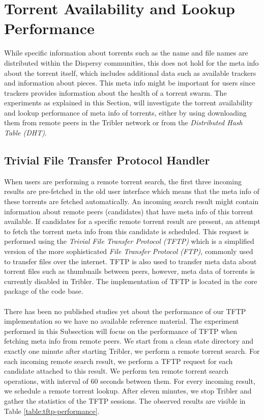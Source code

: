\section{Torrent Availability and Lookup Performance}
While specific information about torrents such as the name and file names are distributed within the Dispersy communities, this does not hold for the meta info about the torrent itself, which includes additional data such as available trackers and information about pieces. This meta info might be important for users since trackers provides information about the health of a torrent swarm. The experiments as explained in this Section, will investigate the torrent availability and lookup performance of meta info of torrents, either by using downloading them from remote peers in the Tribler network or from the \emph{Distributed Hash Table (DHT)}.

\subsection{Trivial File Transfer Protocol Handler}
When users are performing a remote torrent search, the first three incoming results are pre-fetched in the old user interface which means that the meta info of these torrents are fetched automatically. An incoming search result might contain information about remote peers (candidates) that have meta info of this torrent available. If candidates for a specific remote torrent result are present, an attempt to fetch the torrent meta info from this candidate is scheduled. This request is performed using the \emph{Trivial File Transfer Protocol (TFTP)}\cite{sollins1992tftp} which is a simplified version of the more sophisticated \emph{File Transfer Protocol (FTP)}\cite{postel1985rfc}, commonly used to transfer files over the internet. TFTP is also used to transfer meta data about torrent files such as thumbnails between peers, however, meta data of torrents is currently disabled in Tribler. The implementation of TFTP is located in the core package of the code base.\\\\
There has been no published studies yet about the performance of our TFTP implementation so we have no available reference material. The experiment performed in this Subsection will focus on the performance of TFTP when fetching meta info from remote peers. We start from a clean state directory and exactly one minute after starting Tribler, we perform a remote torrent search. For each incoming remote search result, we perform a TFTP request for each candidate attached to this result. We perform ten remote torrent search operations, with interval of 60 seconds between them. For every incoming result, we schedule a remote torrent lookup. After eleven minutes, we stop Tribler and gather the statistics of the TFTP sessions. The observed results are visible in Table \ref{table:tftp-performance}.\\

